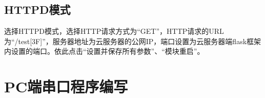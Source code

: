 \documentclass[a4paper,11pt]{ctexart}
\begin{document}
\begin{spacing}{1.5}
\subsection{HTTPD模式}
\par
选择HTTPD模式，选择HTTP请求方式为“GET”，HTTP请求的URL为“/test[3F]”，服务器地址为云服务器的公网IP，端口设置为云服务器端flask框架内设置的端口。依此点击“设置并保存所有参数”、“模块重启”。



\section{PC端串口程序编写}







\end{spacing}


	
\end{document}
